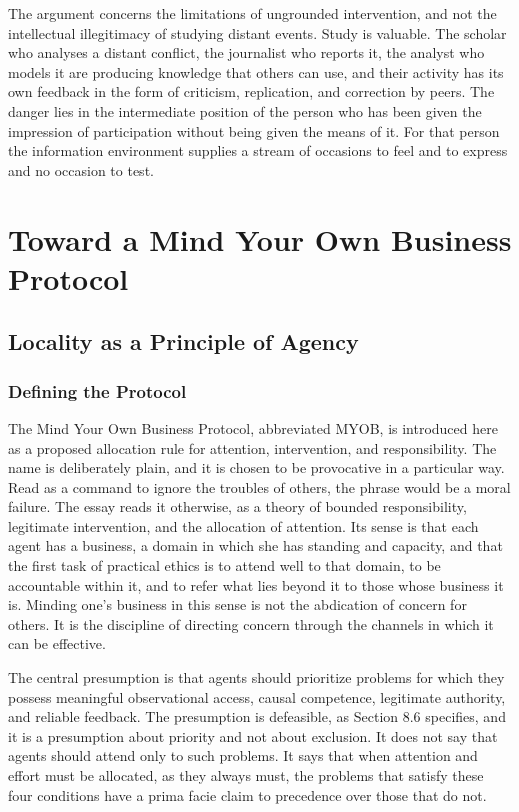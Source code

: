 \documentclass[11pt]{report}
\theoremstyle{definition}
\theoremstyle{remark}
\begin{document}
The argument concerns the limitations of ungrounded intervention, and not the intellectual illegitimacy of studying distant events. Study is valuable. The scholar who analyses a distant conflict, the journalist who reports it, the analyst who models it are producing knowledge that others can use, and their activity has its own feedback in the form of criticism, replication, and correction by peers. The danger lies in the intermediate position of the person who has been given the impression of participation without being given the means of it. For that person the information environment supplies a stream of occasions to feel and to express and no occasion to test.

\part{Toward a Mind Your Own Business Protocol}

\chapter{Locality as a Principle of Agency}

\section{Defining the Protocol}

The Mind Your Own Business Protocol, abbreviated MYOB, is introduced here as a proposed allocation rule for attention, intervention, and responsibility. The name is deliberately plain, and it is chosen to be provocative in a particular way. Read as a command to ignore the troubles of others, the phrase would be a moral failure. The essay reads it otherwise, as a theory of bounded responsibility, legitimate intervention, and the allocation of attention. Its sense is that each agent has a business, a domain in which she has standing and capacity, and that the first task of practical ethics is to attend well to that domain, to be accountable within it, and to refer what lies beyond it to those whose business it is. Minding one's business in this sense is not the abdication of concern for others. It is the discipline of directing concern through the channels in which it can be effective.

The central presumption is that agents should prioritize problems for which they possess meaningful observational access, causal competence, legitimate authority, and reliable feedback. The presumption is defeasible, as Section 8.6 specifies, and it is a presumption about priority and not about exclusion. It does not say that agents should attend only to such problems. It says that when attention and effort must be allocated, as they always must, the problems that satisfy these four conditions have a prima facie claim to precedence over those that do not.
\end{document}
